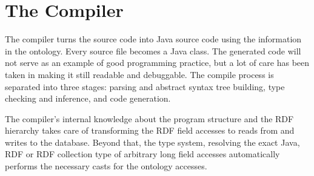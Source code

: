 \newcommand{\caret}{{\large\textbf{\textasciicircum}}}

\section{The \vonda Compiler}

The compiler turns the \vonda source code into Java source code using the information
in the ontology. Every source file becomes a Java class. The generated code
will not serve as an example of good programming practice, but a lot of care
has been taken in making it still readable and debuggable. The
compile process is separated into three stages: parsing and abstract syntax tree building,
type checking and inference, and code generation.

The \vonda compiler's internal knowledge about the program structure and the
RDF hierarchy takes care of transforming the RDF field accesses to reads from and
writes to the database. Beyond that, the type system, resolving the exact
Java, RDF or RDF collection type of arbitrary long field accesses automatically
performs the necessary casts for the ontology accesses.

%
%
%
%

